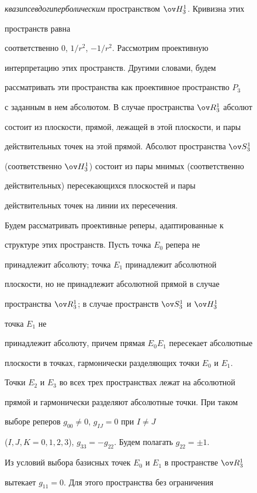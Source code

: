 {\it квазипсевдогиперболическим} пространством $\ov H^1_3$. Кривизна этих


пространств равна


соответственно 0, $1/r^2$, $-1/r^2$. Рассмотрим проективную


интерпретацию этих пространств. Другими словами, будем


рассматривать эти пространства как проективное пространство $P_3$


с заданным в нем абсолютом. В случае пространства $\ov R^1_3$ абсолют


состоит из плоскости, прямой, лежащей в этой плоскости, и пары


действительных точек на этой прямой. Абсолют пространства $\ov S^1_3$


(соответственно $\ov H^1_3$) состоит из пары мнимых (соответственно


действительных) пересекающихся плоскостей и пары


действительных точек на линии их пересечения.





Будем рассматривать проективные реперы, адаптированные к


структуре этих пространств. Пусть точка $E_0$ репера не


принадлежит абсолюту; точка $E_1$ принадлежит абсолютной


плоскости, но не принадлежит абсолютной прямой в случае


пространства $\ov R^1_3$; в случае пространств $\ov S^1_3$ и $\ov H^1_3$ 


точка $E_1$ не


принадлежит абсолюту, причем прямая $E_0E_1$ пересекает абсолютные


плоскости в точках, гармонически разделяющих точки $E_0$ и $E_1$.


Точки $E_2$ и $E_3$ во всех трех пространствах лежат на абсолютной


прямой и гармонически разделяют абсолютные точки. При таком


выборе реперов $g_{00}\ne0$, $g_{IJ}=0$ при $I\ne J$


($I,J,K=0,1,2,3$), $g_{33}=-g_{22}$. Будем полагать $g_{22}=\pm1$.





Из условий выбора базисных точек $E_0$ и $E_1$ в пространстве $\ov R^1_3$


вытекает $g_{11}=0$. Для этого пространства без ограничения


